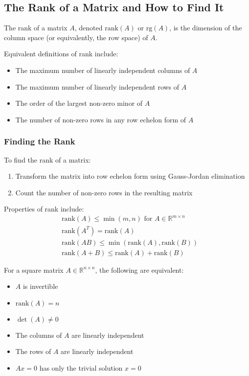 \subsection{The Rank of a Matrix and How to Find It}

The rank of a matrix \(A\), denoted \(\text{rank}(A)\) or \(\text{rg}(A)\), is the dimension of the column space (or equivalently, the row space) of \(A\).

Equivalent definitions of rank include:
\begin{itemize}[label=\(-\)]
    \item The maximum number of linearly independent columns of \(A\)
    \item The maximum number of linearly independent rows of \(A\)
    \item The order of the largest non-zero minor of \(A\)
    \item The number of non-zero rows in any row echelon form of \(A\)
\end{itemize}

\subsubsection{Finding the Rank}

To find the rank of a matrix:
\begin{enumerate}
    \item Transform the matrix into row echelon form using Gauss-Jordan elimination
    \item Count the number of non-zero rows in the resulting matrix
\end{enumerate}

Properties of rank include:
\begin{align*}
&\text{rank}(A) \leq \min(m,n) \text{ for } A \in \mathbb{R}^{m \times n} \\
&\text{rank}(A^T) = \text{rank}(A) \\
&\text{rank}(AB) \leq \min(\text{rank}(A), \text{rank}(B)) \\
&\text{rank}(A+B) \leq \text{rank}(A) + \text{rank}(B)
\end{align*}

For a square matrix \(A \in \mathbb{R}^{n \times n}\), the following are equivalent:
\begin{itemize}[label=\(-\)]
    \item \(A\) is invertible
    \item \(\text{rank}(A) = n\)
    \item \(\det(A) \neq 0\)
    \item The columns of \(A\) are linearly independent
    \item The rows of \(A\) are linearly independent
    \item \(Ax = 0\) has only the trivial solution \(x = 0\)
\end{itemize}

